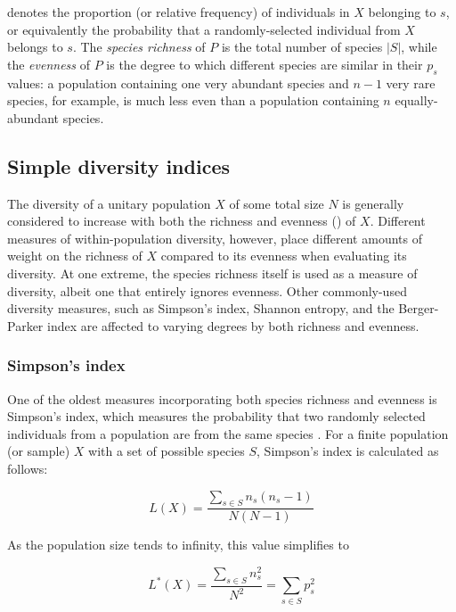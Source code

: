 \noindent denotes the proportion (or relative frequency) of individuals in $X$ belonging to $s$, or equivalently the probability that a randomly-selected individual from $X$ belongs to $s$. The \textit{species richness} of $P$ is the total number of species $|S|$, while the \textit{evenness} of $P$ is the degree to which different species are similar in their $p_s$ values: a population containing one very abundant species and $n-1$ very rare species, for example, is much less even than a population containing $n$ equally-abundant species.

\subsection{Simple diversity indices}
\label{sec:diversity-unitary-simple}

The diversity of a unitary population $X$ of some total size $N$ is generally considered to increase with both the richness and evenness () of $X$. Different measures of within-population diversity, however, place different amounts of weight on the richness of $X$ compared to its evenness when evaluating its diversity. At one extreme, the species richness itself is used as a measure of diversity, albeit one that entirely ignores evenness. Other commonly-used diversity measures, such as Simpson's index, Shannon entropy, and the Berger-Parker index %
are affected to varying degrees by both richness and evenness.

\subsubsection{Simpson's index}

One of the oldest measures incorporating both species richness and evenness is Simpson's index, which measures the probability that two randomly selected individuals from a population are from the same species \citep{simpson1949diversity}. For a finite population (or sample) $X$ with a set of possible species $S$, Simpson's index is calculated as follows:

\begin{equation}
L(X) = \frac{\sum_{s \in S} n_s(n_s-1)}{N(N-1)}
\label{eq:simpson_finite}
\end{equation} 

\noindent As the population size tends to infinity, this value simplifies to

\begin{equation}
L^*(X) = \frac{\sum_{s \in S} n_s^2}{N^2} = \sum_{s \in S} p_s^2
\label{eq:simpson_finite}
\end{equation} 

